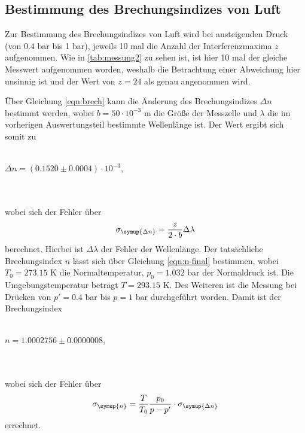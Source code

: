     \subsection{Bestimmung des Brechungsindizes von Luft}
            Zur Bestimmung des Brechungsindizes von Luft wird bei ansteigenden Druck (von $0.4$ bar bis 1 bar), jeweils 10 mal 
            die Anzahl der Interferenzmaxima $z$ aufgenommen. Wie in \autoref{tab:messung2} zu sehen ist, ist hier 10 mal der gleiche 
            Messwert aufgenommen worden, weshalb die Betrachtung einer Abweichung hier unsinnig ist und der Wert von $z = 24$ als genau 
            angenommen wird.
            
            Über Gleichung \eqref{eqn:brech} kann die Änderung des Brechungsindizes $\Delta n$ bestimmt werden, wobei
            $b = 50 \cdot 10^{-3}$ m die Größe der Messzelle und $\lambda$ die im vorherigen Auswertungsteil bestimmte Wellenlänge ist.
            Der Wert ergibt sich somit zu 
            \\ \\
            \centerline{$\Delta n = (0.1520 \pm 0.0004) \cdot 10^{-3}$,}
            \\ \\
            wobei sich der Fehler über 
            \begin{equation}
               \sigma_{\symup{\Delta n}} = \frac{z}{2 \cdot b} \Delta \lambda
            \end{equation}
            berechnet. Hierbei ist $\Delta \lambda$ der Fehler der Wellenlänge.
            Der tatsächliche Brechungsindex $n$ lässt sich über Gleichung \eqref{eqn:n-final} bestimmen, wobei $T_0 = 273.15$ K die Normaltemperatur, $p_0 = 1.032$ bar 
            der Normaldruck ist. Die Umgebungstemperatur beträgt $T = 293.15$ K. Des Weiteren ist die Messung bei Drücken von $p' = 0.4$ bar
            bis $p = 1$ bar durchgeführt worden. Damit ist der Brechungsindex
            \\ \\
            \centerline{$n = 1.0002756 \pm 0.0000008$,}
            \\ \\
            wobei sich der Fehler über
            \begin{equation}
                \sigma_{\symup{n}} = \frac{T}{T_0} \frac{p_0}{p- p'} \cdot \sigma_{\symup{\Delta n}}
            \end{equation}
            errechnet.    